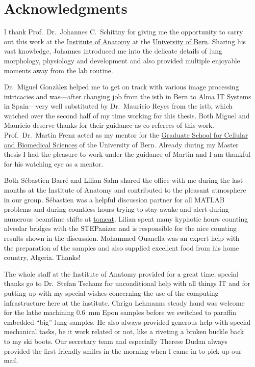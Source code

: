 \acresetall
{}

\begingroup
\let\clearpage\relax
\let\cleardoublepage\relax
\let\cleardoublepage\relax
\chapter*{Acknowledgments}
I thank Prof.\ Dr.\ Johannes C.\ Schittny for giving me the opportunity to carry out this work at the \href{http://www.ana.unibe.ch/}{Institute of Anatomy} at the \href{http://unibe.ch/}{University of Bern}. Sharing his vast knowledge, Johannes introduced me into the delicate details of lung morphology, physiology and development and also provided multiple enjoyable moments away from the lab routine.

Dr.\ Miguel Gonzàlez helped me to get on track with various image processing intricacies and was---after changing job from the \href{http://www.istb.unibe.ch/}{\ac{istb}} in Bern to \href{http://www.alma3d.com/}{Alma IT Systems} in Spain---very well substituted by Dr.\ Mauricio Reyes from the \ac{istb}, which watched over the second half of my time working for this thesis. Both Miguel and Mauricio deserve thanks for their guidance as co-referees of this work. Prof.\ Dr.\ Martin Frenz acted as my mentor for the \href{http://www.gcb.unibe.ch/}{Graduate School for Cellular and Biomedical Sciences} of the University of Bern. Already during my Master thesis I had the pleasure to work under the guidance of  Martin and I am thankful for his watching eye as a mentor.

Both Sébastien Barré and Lilian Salm shared the office with me during the last months at the Institute of Anatomy and contributed to the pleasant atmosphere in our group. Sébastien was a helpful discussion partner for all MATLAB problems and during countless hours trying to stay awake and alert during numerous beamtime shifts at \href{http://sls.web.psi.ch/view.php/beamlines/tomcat/}{\acs{tomcat}}. Lilian spent many kyphotic hours counting alveolar bridges with the STEPanizer and is responsible for the nice counting results shown in the discussion. Mohammed Ouanella was an expert help with the preparation of the samples and also supplied excellent food from his home country, Algeria. Thanks!

The whole staff at the Institute of Anatomy provided for a great time; special thanks go to Dr.\ Stefan Tschanz for unconditional help with all things IT and for putting up with my special wishes concerning the use of the computing infrastructure here at the institute. Chrigu Lehmanns steady hand was welcome for the lathe machining \SI{0.6}{\milli\meter} Epon samples before we switched to paraffin embedded ``big'' lung samples. He also always provided generous help with special mechanical tasks, be it work related or not, \eg like a riveting a broken buckle back to my ski boots. Our secretary team and especially Therese Dudan always provided the first friendly smiles in the morning when I came in to pick up our mail.

